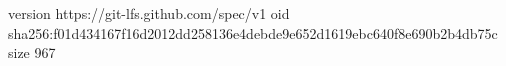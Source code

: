 version https://git-lfs.github.com/spec/v1
oid sha256:f01d434167f16d2012dd258136e4debde9e652d1619ebc640f8e690b2b4db75c
size 967
